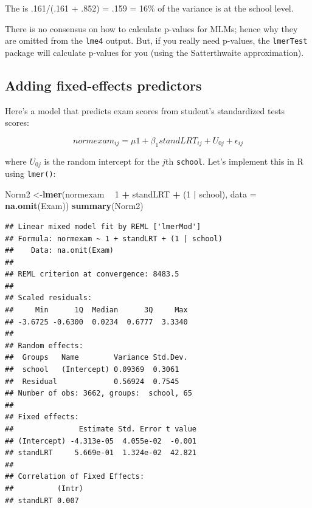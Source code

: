 \documentclass[]{book}
\newenvironment{Shaded}{\begin{snugshade}}{\end{snugshade}}
\newcommand{\DataTypeTok}[1]{\textcolor[rgb]{0.13,0.29,0.53}{#1}}
\newcommand{\DecValTok}[1]{\textcolor[rgb]{0.00,0.00,0.81}{#1}}
\newcommand{\KeywordTok}[1]{\textcolor[rgb]{0.13,0.29,0.53}{\textbf{#1}}}
\newcommand{\NormalTok}[1]{#1}
\newcommand{\OperatorTok}[1]{\textcolor[rgb]{0.81,0.36,0.00}{\textbf{#1}}}
\newcommand{\StringTok}[1]{\textcolor[rgb]{0.31,0.60,0.02}{#1}}
\begin{document}
The is .161/(.161 + .852) = .159 = 16\% of the variance is at the school level.

There is no consensus on how to calculate p-values for MLMs; hence why they are omitted from the \texttt{lme4} output.
But, if you really need p-values, the \texttt{lmerTest} package will calculate p-values for you (using the Satterthwaite
approximation).

\hypertarget{adding-fixed-effects-predictors}{%
\subsection{Adding fixed-effects predictors}\label{adding-fixed-effects-predictors}}

Here's a model that predicts exam scores from student's standardized tests scores:

\[
normexam_{ij} = \mu1 + \beta_1standLRT_{ij} + U_{0j} + \epsilon_{ij}
\]

where \(U_{0j}\) is the random intercept for the \(j\)th \texttt{school}. Let's implement this in R using \texttt{lmer()}:

\begin{Shaded}
\begin{Highlighting}[]
\NormalTok{  Norm2 <-}\KeywordTok{lmer}\NormalTok{(normexam }\OperatorTok{~}\StringTok{ }\DecValTok{1} \OperatorTok{+}\StringTok{ }\NormalTok{standLRT }\OperatorTok{+}\StringTok{ }\NormalTok{(}\DecValTok{1} \OperatorTok{|}\StringTok{ }\NormalTok{school),}
               \DataTypeTok{data =} \KeywordTok{na.omit}\NormalTok{(Exam)) }
  \KeywordTok{summary}\NormalTok{(Norm2) }
\end{Highlighting}
\end{Shaded}

\begin{verbatim}
## Linear mixed model fit by REML ['lmerMod']
## Formula: normexam ~ 1 + standLRT + (1 | school)
##    Data: na.omit(Exam)
## 
## REML criterion at convergence: 8483.5
## 
## Scaled residuals: 
##     Min      1Q  Median      3Q     Max 
## -3.6725 -0.6300  0.0234  0.6777  3.3340 
## 
## Random effects:
##  Groups   Name        Variance Std.Dev.
##  school   (Intercept) 0.09369  0.3061  
##  Residual             0.56924  0.7545  
## Number of obs: 3662, groups:  school, 65
## 
## Fixed effects:
##               Estimate Std. Error t value
## (Intercept) -4.313e-05  4.055e-02  -0.001
## standLRT     5.669e-01  1.324e-02  42.821
## 
## Correlation of Fixed Effects:
##          (Intr)
## standLRT 0.007
\end{verbatim}
\end{document}
